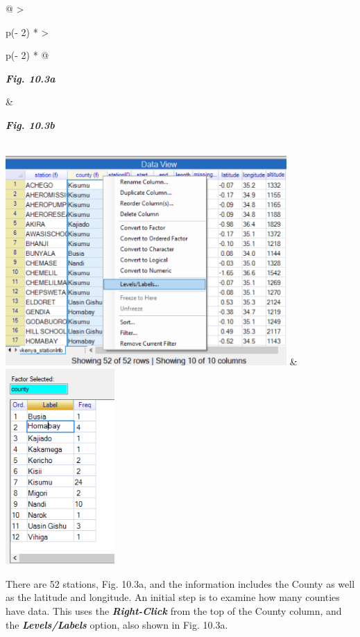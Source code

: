 \documentclass[
  letterpaper,
  DIV=11,
  numbers=noendperiod]{scrreprt}
\begin{document}
\begin{longtable}[]{@{}
  >{\raggedright\arraybackslash}p{(\columnwidth - 2\tabcolsep) * }
  >{\raggedright\arraybackslash}p{(\columnwidth - 2\tabcolsep) * }@{}}
\toprule\noalign{}
\begin{minipage}[b]{\linewidth}\raggedright
\textbf{\emph{Fig. 10.3a}}
\end{minipage} & \begin{minipage}[b]{\linewidth}\raggedright
\textbf{\emph{Fig. 10.3b}}
\end{minipage} \\
\midrule\noalign{}
\endhead
\bottomrule\noalign{}
\endlastfoot
\includegraphics[width=4.21904in,height=3.15575in]{figures/Fig10.3a.png}
&
\includegraphics[width=1.6362in,height=2.94297in]{figures/Fig10.3b.png} \\
\end{longtable}

There are 52 stations, Fig. 10.3a, and the information includes the
County as well as the latitude and longitude. An initial step is to
examine how many counties have data. This uses the
\textbf{\emph{Right-Click}} from the top of the County column, and the
\textbf{\emph{Levels/Labels}} option, also shown in Fig. 10.3a.
\end{document}
